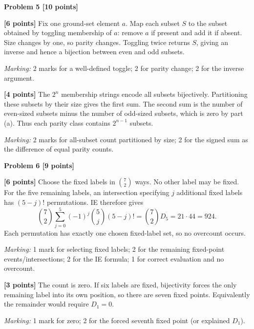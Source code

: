 \documentclass[12pt,letterpaper]{article}
\newcommand{\problemheading}[2][5\baselineskip]{\Needspace{#1}\par\noindent\hspace*{-0.625in}\textbf{#2}\par\nobreak\vspace{0.3em}}
\begin{document}
\vspace{0.65em}
\problemheading[\dimexpr 3\baselineskip+4\baselineskip\relax]{Problem 5 [10 points]}
\begin{description}[font=\normalfont,leftmargin=1.2em,labelsep=0.4em]
\item[(a)] \textbf{[6 points]} Fix one ground-set element $a$. Map each subset $S$ to the subset obtained by toggling membership of $a$: remove $a$ if present and add it if absent. Size changes by one, so parity changes. Toggling twice returns $S$, giving an inverse and hence a bijection between even and odd subsets.
\par\textit{Marking:} 2 marks for a well-defined toggle; 2 for parity change; 2 for the inverse argument.
\item[(b)] \textbf{[4 points]} The $2^n$ membership strings encode all subsets bijectively. Partitioning these subsets by their size gives the first sum. The second sum is the number of even-sized subsets minus the number of odd-sized subsets, which is zero by part (a). Thus each parity class contains $2^{n-1}$ subsets.
\par\textit{Marking:} 2 marks for all-subset count partitioned by size; 2 for the signed sum as the difference of equal parity counts.
\end{description}
\vspace{0.65em}
\problemheading[\dimexpr 3\baselineskip+4\baselineskip\relax]{Problem 6 [9 points]}
\begin{description}[font=\normalfont,leftmargin=1.2em,labelsep=0.4em]
\item[(a)] \textbf{[6 points]} Choose the fixed labels in $\binom72$ ways. No other label may be fixed. For the five remaining labels, an intersection specifying $j$ additional fixed labels has $(5-j)!$ permutations. IE therefore gives\[\binom72\sum_{j=0}^{5}(-1)^j\binom5j(5-j)!=\binom72D_5=21\cdot44=924.\]Each permutation has exactly one chosen fixed-label set, so no overcount occurs.
\par\textit{Marking:} 1 mark for selecting fixed labels; 2 for the remaining fixed-point events/intersections; 2 for the IE formula; 1 for correct evaluation and no overcount.
\item[(b)] \textbf{[3 points]} The count is zero. If six labels are fixed, bijectivity forces the only remaining label into its own position, so there are seven fixed points. Equivalently the remainder would require $D_1=0$.
\par\textit{Marking:} 1 mark for zero; 2 for the forced seventh fixed point (or explained $D_1$).
\end{description}
\end{document}
